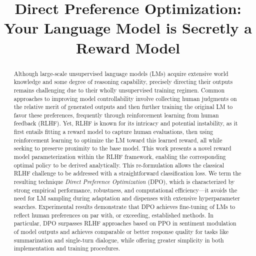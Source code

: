 \title{Direct Preference Optimization: Your Language Model is Secretly a Reward Model}

\begin{abstract}
Although large-scale unsupervised language models (LMs) acquire extensive world knowledge and some degree of reasoning capability, precisely directing their outputs remains challenging due to their wholly unsupervised training regimen. Common approaches to improving model controllability involve collecting human judgments on the relative merit of generated outputs and then further training the original LM to favor these preferences, frequently through reinforcement learning from human feedback (RLHF). Yet, RLHF is known for its intricacy and potential instability, as it first entails fitting a reward model to capture human evaluations, then using reinforcement learning to optimize the LM toward this learned reward, all while seeking to preserve proximity to the base model. This work presents a novel reward model parameterization within the RLHF framework, enabling the corresponding optimal policy to be derived analytically. This re-formulation allows the classical RLHF challenge to be addressed with a straightforward classification loss. We term the resulting technique \textit{Direct Preference Optimization} (DPO), which is characterized by strong empirical performance, robustness, and computational efficiency—it avoids the need for LM sampling during adaptation and dispenses with extensive hyperparameter searches. Experimental results demonstrate that DPO achieves fine-tuning of LMs to reflect human preferences on par with, or exceeding, established methods. In particular, DPO surpasses RLHF approaches based on PPO in sentiment modulation of model outputs and achieves comparable or better response quality for tasks like summarization and single-turn dialogue, while offering greater simplicity in both implementation and training procedures.
\end{abstract}

